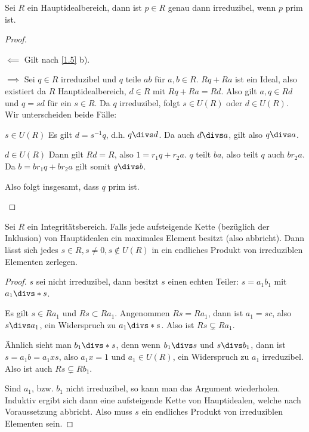 \begin{lem} \label{1.7}
	Sei $R$ ein Hauptidealbereich, dann ist $p \in R$ genau dann irreduzibel, wenn $p$ prim ist.
	\begin{proof}
		\begin{segnb}{$\impliedby$}
			Gilt nach \ref{1.5} b).
		\end{segnb}
		\begin{segnb}{$\implies$}
			Sei $q \in R$ irreduzibel und $q$ teile $ab$ für $a, b \in R$.
			$Rq + Ra$ ist ein Ideal, also existiert da $R$ Hauptidealbereich, $d \in R$ mit $Rq + Ra = Rd$.
			Also gilt $a,q \in Rd$ und $q = sd$ für ein $s \in R$.
			Da $q$ irreduzibel, folgt $s \in U(R)$ oder $d \in U(R)$.
			Wir unterscheiden beide Fälle:
			\begin{segnb}{$s\in U(R)$}
				Es gilt $d = s^{-1}q$, d.h. $q \divs d$.
				Da auch $d \divs a$, gilt also $q\divs a$.
			\end{segnb}
			\begin{segnb}{$d\in U(R)$}
				Dann gilt $Rd = R$, also $1 = r_1 q + r_2 a$.
				$q$ teilt $ba$, also teilt $q$ auch $b r_2 a$.
				Da $b = b r_1 q + b r_2 a$ gilt somit $q \divs  b$.
			\end{segnb}
			Also folgt insgesamt, dass $q$ prim ist.
		\end{segnb}
	\end{proof}
\end{lem}

\begin{lem} \label{1.8}
	Sei $R$ ein Integritätsbereich.
	Falls jede aufsteigende Kette (bezüglich der Inklusion) von Hauptidealen ein maximales Element besitzt (also abbricht).
	Dann lässt sich jedes $s \in R, s \neq 0, s \not \in U(R)$ in ein endliches Produkt von irreduziblen Elementen zerlegen.
	\begin{proof}
		$s$ sei nicht irreduzibel, dann besitzt $s$ einen echten Teiler: $s = a_1 b_1$ mit $a_1 \divs*  s$.

		Es gilt $s \in Ra_1$ und $Rs \subset Ra_1$.
		Angenommen $Rs = Ra_1$, dann ist $a_1 = s c$, also $s \divs  a_1$, ein Widerspruch zu $a_1 \divs*  s$.
		Also ist $Rs \subsetneq Ra_1$.

		Ähnlich sieht man $b_1 \divs*  s$, denn wenn $b_1 \divs  s$ und $s \divs  b_1$, dann ist $s = a_1 b = a_1 x s$, also $a_1 x = 1$ und $a_1 \in U(R)$, ein Widerspruch zu $a_1$ irreduzibel.
		Also ist auch $Rs \subsetneq Rb_1$.

		Sind $a_1$, bzw. $b_1$ nicht irreduzibel, so kann man das Argument wiederholen.
		Induktiv ergibt sich dann eine aufsteigende Kette von Hauptidealen, welche nach Voraussetzung abbricht.
		Also muss $s$ ein endliches Produkt von irreduziblen Elementen sein.
	\end{proof}
\end{lem}

